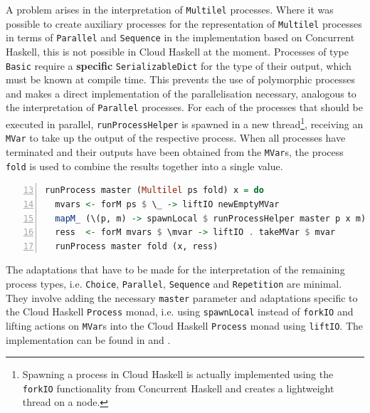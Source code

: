 \vspace*{-0.5em}
A problem arises in the interpretation of \texttt{Multilel} processes. Where it was possible to create auxiliary processes for the representation of \texttt{Multilel} processes in terms of \texttt{Parallel} and \texttt{Sequence} in the implementation based on \textsf{Concurrent Haskell}, this is not possible in \textsf{Cloud Haskell} at the moment. Processes of type \texttt{Basic} require a \textbf{specific} \texttt{SerializableDict} for the type of their output, which must be known at compile time. This prevents the use of polymorphic processes and makes a direct implementation of the parallelisation necessary, analogous to the interpretation of \texttt{Parallel} processes. For each of the processes that should be executed in parallel, \texttt{runProcessHelper} is spawned in a new thread\footnote{Spawning a process in \textsf{Cloud Haskell} is actually implemented using the \texttt{forkIO} functionality from \textsf{Concurrent Haskell} and creates a lightweight thread on a node.}, receiving an \texttt{MVar} to take up the output of the respective process. When all processes have terminated and their outputs have been obtained from the \texttt{MVar}s, the process \texttt{fold} is used to combine the results together into a single value.
\begin{lstlisting}[language=Haskell,caption=Implementation of the interpreter for \texttt{Multilel} processes.,label=lst:runprocess_multilel,numbers=left,frame=bt,firstnumber=13]
runProcess master (Multilel ps fold) x = do
  mvars <- forM ps $ \_ -> liftIO newEmptyMVar
  mapM_ (\(p, m) -> spawnLocal $ runProcessHelper master p x m)   (ps `zip` mvars)
  ress  <- forM mvars $ \mvar -> liftIO . takeMVar $ mvar
  runProcess master fold (x, ress)
\end{lstlisting}

\vspace*{-0.5em}
The adaptations that have to be made for the interpretation of the remaining process types, i.e. \texttt{Choice}, \texttt{Parallel}, \texttt{Sequence} and \texttt{Repetition} are minimal. They involve adding the necessary \texttt{master} parameter and adaptations specific to the \textsf{Cloud Haskell} \texttt{Process} monad, i.e. using \texttt{spawnLocal} instead of \texttt{forkIO} and lifting actions on \texttt{MVar}s into the \textsf{Cloud Haskell} \texttt{Process} monad using \texttt{liftIO}. The implementation can be found in  and .


